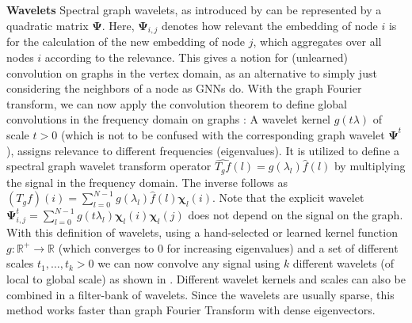 \documentclass{article}
\begin{document}
\textbf{Wavelets} %
Spectral graph wavelets, as introduced by \citet{hammond2011wavelets} can be represented by a quadratic matrix $\mathbf{\Psi}$. Here, $\mathbf{\Psi}_{i,j}$ denotes how relevant the embedding of node $i$ is for the calculation of the new embedding of node $j$, which aggregates over all nodes $i$ according to the relevance.
This gives a notion for (unlearned) convolution on graphs in the vertex domain, as an alternative to simply just considering the neighbors of a node as GNNs do.
With the graph Fourier transform, we can now apply the convolution theorem to define global convolutions in the frequency domain on graphs \cite{bruna2014spectral}: A wavelet kernel $g(t\lambda)$ of scale $t>0$ (which is not to be confused with the corresponding graph wavelet $\mathbf{\Psi}^t$), assigns relevance to different frequencies (eigenvalues).
It is utilized to define a spectral graph wavelet transform operator $\widehat{T_gf}(l) = g(\lambda_l)\hat{f}(l)$ by multiplying the signal in the frequency domain.
The inverse follows as $(T_gf)(i) = \sum_{l=0}^{N-1}g(\lambda_l)\hat{f}(l)\mathbf{\chi}_l(i)$. Note that the explicit wavelet $\mathbf{\Psi}^t_{i,j} = \sum_{l=0}^{N-1} g(t\lambda_l)\mathbf{\chi}_l(i)\mathbf{\chi}_l(j)$ does not depend on the signal on the graph. With this definition of wavelets, using a hand-selected or learned kernel function $g: \mathbb{R^+}\to \mathbb{R}$ (which converges to $0$ for increasing eigenvalues) and a set of different scales $t_1, \ldots, t_k >0$ we can now convolve any signal using $k$ different wavelets (of local to global scale) as shown in .  Different wavelet kernels and scales can also be combined in a filter-bank of wavelets. Since the wavelets are usually sparse, this method works faster than graph Fourier Transform with dense eigenvectors.
\end{document}
